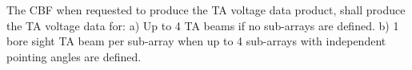 The CBF when requested to produce the TA voltage data product, shall produce
the TA voltage data for: a) Up to 4 TA beams if no sub-arrays are
defined. b) 1 bore sight TA beam per sub-array when up to 4 sub-arrays with
independent pointing angles are defined.
